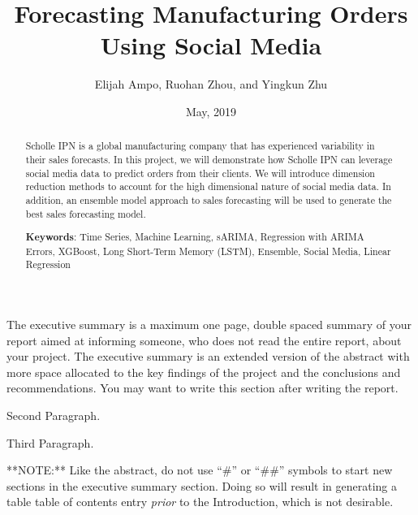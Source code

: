 \documentclass[12pt,oneside]{chicagocapstone}
\title{Forecasting Manufacturing Orders Using Social Media}
\author{Elijah Ampo, Ruohan Zhou, and Yingkun Zhu}
\date{May, 2019} %
\begin{document}
  \maketitle

\frontmatter %
\pagestyle{empty} %


  \begin{abstract}
    Scholle IPN is a global manufacturing company that has experienced
    variability in their sales forecasts. In this project, we will
    demonstrate how Scholle IPN can leverage social media data to predict
    orders from their clients. We will introduce dimension reduction methods
    to account for the high dimensional nature of social media data. In
    addition, an ensemble model approach to sales forecasting will be used
    to generate the best sales forecasting model.
    
    \bigskip  \bigskip
    \bigskip
    
    \textbf{Keywords}: Time Series, Machine Learning, sARIMA, Regression
    with ARIMA Errors, XGBoost, Long Short-Term Memory (LSTM), Ensemble,
    Social Media, Linear Regression
    
    \bigskip  \bigskip
    \bigskip
  \end{abstract}
  \begin{executive}
    The executive summary is a maximum one page, double spaced summary of
    your report aimed at informing someone, who does not read the entire
    report, about your project. The executive summary is an extended version
    of the abstract with more space allocated to the key findings of the
    project and the conclusions and recommendations. You may want to write
    this section after writing the report.
    
    Second Paragraph.
    
    Third Paragraph.
    
    \bigskip
    \bigskip
    \bigskip
    **NOTE:** Like the abstract, do not use ``\#'' or ``\#\#'' symbols to
    start new sections in the executive summary section. Doing so will
    result in generating a table table of contents entry \emph{prior} to the
    Introduction, which is not desirable.
  \end{executive}




  \hypersetup{linkcolor=black}
  \setcounter{tocdepth}{2}
  \tableofcontents
\end{document}

